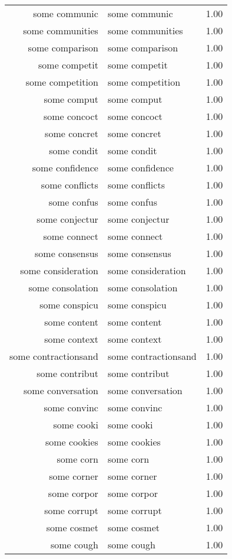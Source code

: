 \begin{table}[ht]
\begin{tabular}{rlr}
  some communic & some communic & 1.00 \\ 
  some communities & some communities & 1.00 \\ 
  some comparison & some comparison & 1.00 \\ 
  some competit & some competit & 1.00 \\ 
  some competition & some competition & 1.00 \\ 
  some comput & some comput & 1.00 \\ 
  some concoct & some concoct & 1.00 \\ 
  some concret & some concret & 1.00 \\ 
  some condit & some condit & 1.00 \\ 
  some confidence & some confidence & 1.00 \\ 
  some conflicts & some conflicts & 1.00 \\ 
  some confus & some confus & 1.00 \\ 
  some conjectur & some conjectur & 1.00 \\ 
  some connect & some connect & 1.00 \\ 
  some consensus & some consensus & 1.00 \\ 
  some consideration & some consideration & 1.00 \\ 
  some consolation & some consolation & 1.00 \\ 
  some conspicu & some conspicu & 1.00 \\ 
  some content & some content & 1.00 \\ 
  some context & some context & 1.00 \\ 
  some contractionsand & some contractionsand & 1.00 \\ 
  some contribut & some contribut & 1.00 \\ 
  some conversation & some conversation & 1.00 \\ 
  some convinc & some convinc & 1.00 \\ 
  some cooki & some cooki & 1.00 \\ 
  some cookies & some cookies & 1.00 \\ 
  some corn & some corn & 1.00 \\ 
  some corner & some corner & 1.00 \\ 
  some corpor & some corpor & 1.00 \\ 
  some corrupt & some corrupt & 1.00 \\ 
  some cosmet & some cosmet & 1.00 \\ 
  some cough & some cough & 1.00 \\ 

\end{tabular}
\end{table}
